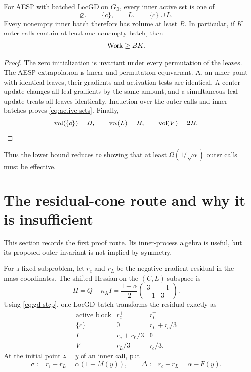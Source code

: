 \documentclass[11pt]{article}
\begin{document}
\begin{lemma}
\label{lem:scan-cost}
For AESP with batched LocGD on $G_B$, every inner active set is one of
\begin{equation}
  \varnothing,\qquad \{c\},\qquad L,\qquad \{c\}\cup L.
  \label{eq:active-sets}
\end{equation}
Every nonempty inner batch therefore has volume at least $B$.  In particular,
if $K$ outer calls contain at least one nonempty batch, then
\begin{equation}
  \operatorname{Work}\geq BK.
  \label{eq:work-vs-calls}
\end{equation}
\end{lemma}

\begin{proof}
The zero initialization is invariant under every permutation of the leaves.
The AESP extrapolation is linear and permutation-equivariant.  At an inner
point with identical leaves, their gradients and activation tests are
identical.  A center update changes all leaf gradients by the same amount,
and a simultaneous leaf update treats all leaves identically.  Induction over
the outer calls and inner batches proves \cref{eq:active-sets}.  Finally,
\[
  \operatorname{vol}(\{c\})=B,
  \qquad
  \operatorname{vol}(L)=B,
  \qquad
  \operatorname{vol}(V)=2B.
\]
\end{proof}

Thus the lower bound reduces to showing that at least
$\Omega(1/\sqrt\alpha)$ outer calls must be effective.

\section{The residual-cone route and why it is insufficient}
\label{sec:cone}

This section records the first proof route.  Its inner-process algebra is
useful, but its proposed outer invariant is not implied by symmetry.

For a fixed subproblem, let $r_c$ and $r_L$ be the negative-gradient residual
in the mass coordinates.  The shifted Hessian on the $(C,L)$ subspace is
\begin{equation}
  H=Q+\kappa_{\mathrm A} I
   =\frac{1-\alpha}{2}
     \begin{pmatrix}3&-1\\-1&3\end{pmatrix}.
  \label{eq:shifted-hessian}
\end{equation}
Using \cref{eq:gd-step}, one LocGD batch transforms the residual exactly as
\begin{equation}
\begin{array}{c|cc}
\text{active block}&r_c^+&r_L^+\\
\hline
\{c\}&0&r_L+r_c/3\\
L&r_c+r_L/3&0\\
V&r_L/3&r_c/3.
\end{array}
\label{eq:residual-map}
\end{equation}
At the initial point $z=y$ of an inner call, put
\begin{equation}
  \sigma:=r_c+r_L=\alpha(1-M(y)),
  \qquad
  \Delta:=r_c-r_L=\alpha-F(y).
  \label{eq:sigma-delta}
\end{equation}
\end{document}
